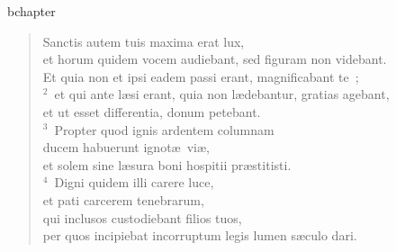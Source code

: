 bchapter\begin{verse}\vspace{-19pt}Sanctis autem tuis maxima erat lux,\\ et horum quidem vocem audiebant, sed figuram non videbant.\\ Et quia non et ipsi eadem passi erant, magnificabant te~;\\
${}^{2}$~et qui ante l\ae si erant, quia non l\ae debantur, gratias agebant,\\ et ut esset differentia, donum petebant.\\
${}^{3}$~Propter quod ignis ardentem columnam\\ ducem habuerunt ignot\ae\ vi\ae ,\\ et solem sine l\ae sura boni hospitii pr\ae stitisti.\\
${}^{4}$~Digni quidem illi carere luce,\\ et pati carcerem tenebrarum,\\ qui inclusos custodiebant filios tuos,\\ per quos incipiebat incorruptum legis lumen s\ae culo dari.\end{verse}


